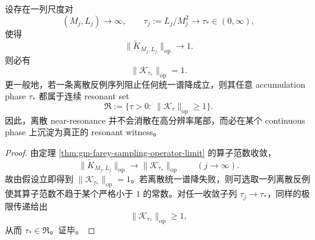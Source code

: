 \begin{theorem}\label{thm:conclusion-discrete-nearresonance-extracts-continuous-resonant-phase}
设存在一列尺度对
\[
(M_j,L_j)\to\infty,
\qquad
\tau_j:=L_j/M_j^2\to\tau_\ast\in(0,\infty),
\]
使得
\[
\|\widetilde K_{M_j,L_j}\|_{\mathrm{op}}\longrightarrow 1.
\]
则必有
\[
\|\mathcal K_{\tau_\ast}\|_{\mathrm{op}}=1.
\]
更一般地，若一条离散反例序列阻止任何统一谱降成立，则其任意 accumulation phase \(\tau_\ast\) 都属于连续 resonant set
\[
\mathfrak R:=\{\tau>0:\ \|\mathcal K_\tau\|_{\mathrm{op}}\ge 1\}.
\]
因此，离散 near-resonance 并不会消散在高分辨率尾部，而必在某个 continuous phase 上沉淀为真正的 resonant witness。
\end{theorem}
\begin{proof}
由定理 \ref{thm:gm-farey-sampling-operator-limit} 的算子范数收敛，
\[
\|\widetilde K_{M_j,L_j}\|_{\mathrm{op}}
\longrightarrow
\|\mathcal K_{\tau_\ast}\|_{\mathrm{op}}
\qquad (j\to\infty).
\]
故由假设立即得到 \(\|\mathcal K_{\tau_\ast}\|_{\mathrm{op}}=1\)。若离散统一谱降失败，则可选取一列离散反例使其算子范数不趋于某个严格小于 \(1\) 的常数。对任一收敛子列 \(\tau_j\to \tau_\ast\)，同样的极限传递给出
\[
\|\mathcal K_{\tau_\ast}\|_{\mathrm{op}}\ge 1,
\]
从而 \(\tau_\ast\in\mathfrak R\)。证毕。
\end{proof}


